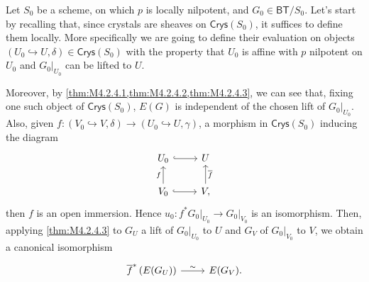 \begin{rem}\label{CrystalLocalPB}
	Let $S_0$ be a scheme, on which $p$ is locally
	nilpotent, and $G_0 \in \mathsf{BT}/S_0$.
	Let's start by recalling that, since crystals are sheaves on $\mathsf{Crys}(S_0)$,
	it suffices to define them locally.
	More specifically we are going to define their evaluation
	on objects $\left(U_0 \hookrightarrow U, \delta\right) \in \mathsf{Crys}(S_0)$
	with the property that $U_0$ is affine with $p$ nilpotent on $U_0$ and
	$\left.G_0\right|_{U_0}$ can be lifted to $U$.

	Moreover, by \cref{thm:M4.2.4.1,thm:M4.2.4.2,thm:M4.2.4.3},
	we can see that, fixing one such object of $\mathsf{Crys}(S_0)$,
	$E(G)$ is independent of the chosen lift of $\left.G_0\right|_{U_0}$.
	Also, given 
	$f\colon \left(V_0 \hookrightarrow V, \delta\right) \to 
	\left(U_0 \hookrightarrow U, \gamma\right)$,
	a morphism in $\mathsf{Crys}(S_0)$
	inducing the diagram
	\begin{equation*}
	\begin{tikzcd}
		U_0 \arrow[r, "", hookrightarrow] &
		U\\
		V_0 \arrow[u, "f", rightarrow] 
		\arrow[r, "", hookrightarrow] &
		V \arrow[u, "\overline{f}"', rightarrow] 
	,\end{tikzcd}
	\end{equation*}
	then $f$ is an open immersion.
	Hence $u_0\colon f^* \left.G_0\right|_{U_0} \to \left.G_0\right|_{V_0}$
	is an isomorphism. 
	Then, applying \cref{thm:M4.2.4.3} to $G_U$ a lift of
	$\left.G_0\right|_{U_0}$ to $U$ and $G_V$ of $\left.G_0\right|_{V_0}$ to $V$,
	we obtain a canonical isomorphism
	\begin{equation*}
	\begin{tikzcd}[row sep = 0ex
		,/tikz/column 1/.append style={anchor=base east}
		,/tikz/column 2/.append style={anchor=base west}]
		\overline{f}^* \left( E(G_U) \right) \arrow[r, "\sim", rightarrow] &
		E(G_V)
	.\end{tikzcd}
	\end{equation*} 
\end{rem}


